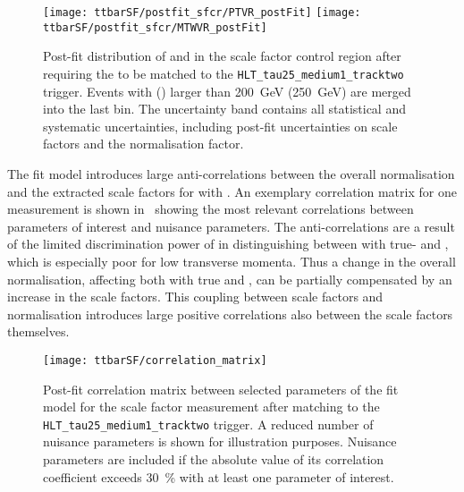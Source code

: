\begin{figure}[htbp]
  \centering

  \texttt{[image: ttbarSF/postfit\_sfcr/PTVR\_postFit]}
  \texttt{[image: ttbarSF/postfit\_sfcr/MTWVR\_postFit]}

  \caption{Post-fit distribution of \tauhadvis \pT and \mTW in the
    scale factor control region after requiring the \tauhadvis to be
    matched to the \texttt{HLT\_tau25\_medium1\_tracktwo}
    trigger. Events with \tauhadvis \pT (\mTW) larger than
    \SI{200}{\GeV} (\SI{250}{\GeV}) are merged into the last bin. The
    uncertainty band contains all statistical and systematic
    uncertainties, including post-fit uncertainties on \faketauhadvis
    scale factors and the \ttbar normalisation factor.}
  \label{fig:ttbarSF_postfit_ptmtw}
\end{figure}

The fit model introduces large anti-correlations between the overall
\ttbar normalisation and the extracted scale factors for \ttbar with
\faketauhadvis. An exemplary correlation matrix for one measurement is
shown in~ showing the most relevant
correlations between parameters of interest and nuisance parameters.
The anti-correlations are a result of the limited discrimination power
of \mTW in distinguishing between \ttbar with true- and
\faketauhadvis, which is especially poor for low \tauhadvis transverse
momenta. Thus a change in the overall \ttbar normalisation, affecting
both \ttbar with true and \faketauhadvis, can be partially compensated
by an increase in the \faketauhadvis scale factors. This coupling
between \faketauhadvis scale factors and \ttbar normalisation
introduces large positive correlations also between the scale factors
themselves.

\begin{figure}[htbp]
  \centering

  \texttt{[image: ttbarSF/correlation\_matrix]}

  \caption{Post-fit correlation matrix between selected parameters of
    the fit model for the \faketauhadvis scale factor measurement
    after matching \tauhadvis to the
    \texttt{HLT\_tau25\_medium1\_tracktwo} trigger. A reduced number
    of nuisance parameters is shown for illustration
    purposes. Nuisance parameters are included if the absolute value
    of its correlation coefficient exceeds \SI{30}{\percent} with at
    least one parameter of interest.}%
  \label{fig:ttbarSF_corr_matrix}
\end{figure}

